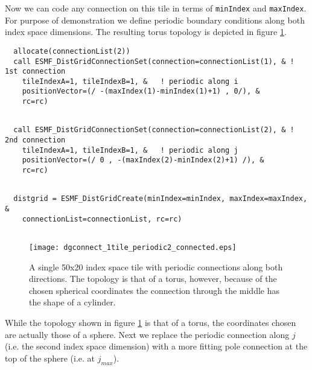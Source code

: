 
   Now we can code any connection on this tile in terms of {\tt minIndex} and
   {\tt maxIndex}. For purpose of demonstration we define periodic boundary
   conditions along both index space dimensions. The resulting torus topology
   is depicted in figure \ref{fig:dgconnect_1tile_periodic2_connected}.  

 \begin{verbatim}
  allocate(connectionList(2))
  call ESMF_DistGridConnectionSet(connection=connectionList(1), & ! 1st connection
    tileIndexA=1, tileIndexB=1, &   ! periodic along i
    positionVector=(/ -(maxIndex(1)-minIndex(1)+1) , 0/), &  
    rc=rc) 
 
\end{verbatim}
 

 \begin{verbatim}
  call ESMF_DistGridConnectionSet(connection=connectionList(2), & ! 2nd connection
    tileIndexA=1, tileIndexB=1, &   ! periodic along j
    positionVector=(/ 0 , -(maxIndex(2)-minIndex(2)+1) /), &  
    rc=rc)
 
\end{verbatim}
 

 \begin{verbatim}
  distgrid = ESMF_DistGridCreate(minIndex=minIndex, maxIndex=maxIndex, &
    connectionList=connectionList, rc=rc)
 
\end{verbatim}
 

  
   \begin{figure}[h]
     \caption{A single 50x20 index space tile with periodic connections
      along both directions. The topology is that of a torus, however, because
      of the chosen spherical coordinates the connection through the middle 
      has the shape of a cylinder.}
     \centering
     \texttt{[image: dgconnect\_1tile\_periodic2\_connected.eps]}
     \label{fig:dgconnect_1tile_periodic2_connected}
   \end{figure}
  
   While the topology shown in figure 
   \ref{fig:dgconnect_1tile_periodic2_connected} is that of a torus, the 
   coordinates chosen are actually those of a sphere. Next we replace
   the periodic connection along $j$ (i.e. the second index space dimension) 
   with a more fitting pole connection at the top of the sphere 
   (i.e. at $j_{max}$).
  
